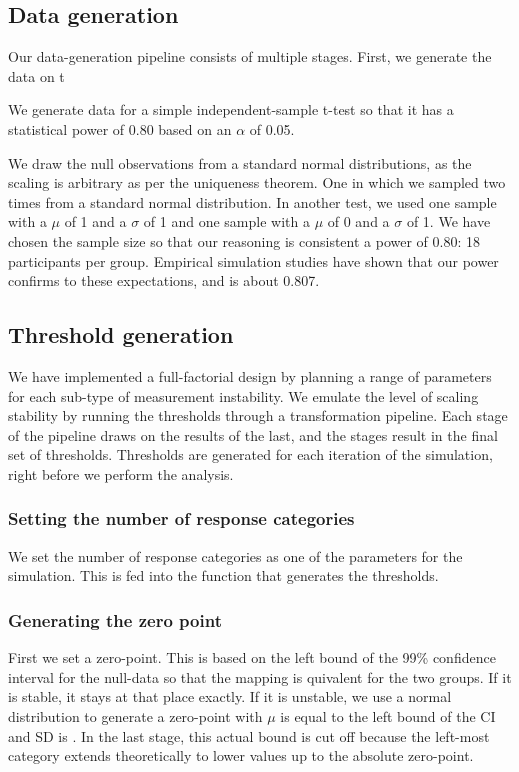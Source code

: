 \documentclass[utf8]{FrontiersinVancouver}
\begin{document}
\subsection{Data generation}
Our data-generation pipeline consists of multiple stages. First, we generate the data on t

We generate data for a simple independent-sample t-test so that it has a statistical power of 0.80 based on an $\alpha$ of 0.05. 

We draw the null observations from a standard normal distributions, as the scaling is arbitrary as per the uniqueness theorem. One in which we sampled two times from a standard normal distribution. In another test, we used one sample with a $\mu$ of 1 and a $\sigma$ of 1 and one sample with a $\mu$ of 0 and a $\sigma$ of 1. We have chosen the sample size so that our reasoning is consistent a power of 0.80: 18 participants per group. Empirical simulation studies have shown that our power confirms to these expectations, and is about 0.807. 

\subsection{Threshold generation}
We have implemented a full-factorial design by planning a range of parameters for each sub-type of measurement instability. We emulate the level of scaling stability by running the thresholds through a transformation pipeline. Each stage of the pipeline draws on the results of the last, and the stages result in the final set of thresholds. Thresholds are generated for each iteration of the simulation, right before we perform the analysis.  

\subsubsection{Setting the number of response categories}
We set the number of response categories as one of the parameters for the simulation. This is fed into the function that generates the thresholds.

\subsubsection{Generating the zero point}
First we set a zero-point. This is based on the left bound of the 99\% confidence interval for the null-data so that the mapping is quivalent for the two groups. If it is stable, it stays at that place exactly. If it is unstable, we use a normal distribution to generate a zero-point with $\mu$ is equal to the left bound of the CI and SD is . In the last stage, this actual bound is cut off because the left-most category extends theoretically to lower values up to the absolute zero-point. 
\end{document}
